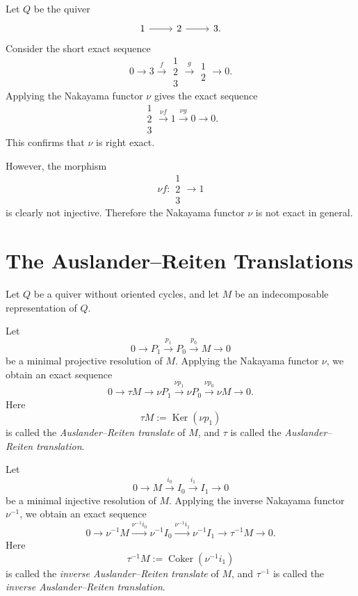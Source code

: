 \documentclass[11pt, a4paper]{report}
\begin{document}
\begin{example}
Let \(Q\) be the quiver
\[
\begin{tikzcd}
1 \arrow[r] & 2 \arrow[r] & 3 .
\end{tikzcd}
\]
Consider the short exact sequence
\[
0
\longrightarrow
3
\xrightarrow{f}
\substack{1\\2\\3}
\xrightarrow{g}
\substack{1\\2}
\longrightarrow
0.
\]
Applying the Nakayama functor \(\nu\) gives the exact sequence
\[
\substack{1\\2\\3}
\xrightarrow{\nu f}
1
\xrightarrow{\nu g}
0
\longrightarrow
0.
\]
This confirms that \(\nu\) is right exact.

However, the morphism
\[
\nu f:\substack{1\\2\\3}\longrightarrow 1
\]
is clearly not injective. Therefore the Nakayama functor \(\nu\) is not exact in
general.
\end{example}

\section{The Auslander--Reiten Translations}

\begin{definition}
Let \(Q\) be a quiver without oriented cycles, and let \(M\) be an indecomposable
representation of \(Q\).

Let
\[
0
\longrightarrow
P_1
\xrightarrow{p_1}
P_0
\xrightarrow{p_0}
M
\longrightarrow
0
\]
be a minimal projective resolution of \(M\). Applying the Nakayama functor \(\nu\),
we obtain an exact sequence
\[
0
\longrightarrow
\tau M
\longrightarrow
\nu P_1
\xrightarrow{\nu p_1}
\nu P_0
\xrightarrow{\nu p_0}
\nu M
\longrightarrow
0.
\]
Here
\[
\tau M:=\operatorname{Ker}(\nu p_1)
\]
is called the \emph{Auslander--Reiten translate} of \(M\), and \(\tau\) is called the
\emph{Auslander--Reiten translation}.
\end{definition}

\begin{definition}
Let
\[
0
\longrightarrow
M
\xrightarrow{i_0}
I_0
\xrightarrow{i_1}
I_1
\longrightarrow
0
\]
be a minimal injective resolution of \(M\). Applying the inverse Nakayama functor
\(\nu^{-1}\), we obtain an exact sequence
\[
0
\longrightarrow
\nu^{-1}M
\xrightarrow{\nu^{-1}i_0}
\nu^{-1}I_0
\xrightarrow{\nu^{-1}i_1}
\nu^{-1}I_1
\longrightarrow
\tau^{-1}M
\longrightarrow
0.
\]
Here
\[
\tau^{-1}M:=\operatorname{Coker}(\nu^{-1}i_1)
\]
is called the \emph{inverse Auslander--Reiten translate} of \(M\), and \(\tau^{-1}\)
is called the \emph{inverse Auslander--Reiten translation}.
\end{definition}
\end{document}
